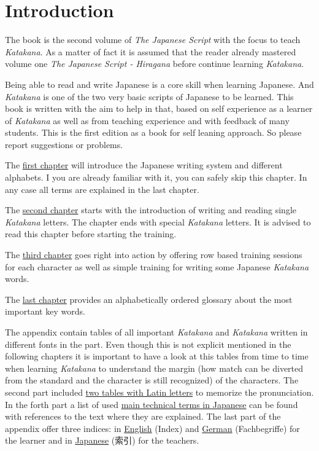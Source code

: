 \chapter*{Introduction}

The book is the second volume of \textit{The Japanese Script} with the focus to
teach \textit{Katakana}. As a matter of fact it is assumed that the reader
already mastered volume one \textit{The Japanese Script - Hiragana} before
continue learning \textit{Katakana}. 

Being able to read and write Japanese is a core skill when learning Japanese.
And \textit{Katakana} is one of the two very basic scripts of Japanese to be
learned.  This book is written with the aim to help in that, based on self
experience as a learner of \textit{Katakana} as well as from teaching
experience and with feedback of many students. This is the first edition as a
book for self leaning approach. So please report suggestions or problems. 

The \hyperref[chap:JapaneseWritingSystem]{first chapter} will introduce the
Japanese writing system and different alphabets. I you are already familiar
with it, you can safely skip this chapter. In any case all terms are explained
in the last chapter.

The \hyperref[chap:WritingKatakana]{second chapter} starts with the
introduction of writing and reading single \textit{Katakana} letters. The
chapter ends with special \textit{Katakana} letters. It is advised to read this
chapter before starting the training. 

The \hyperref[chap:KatakanaTraining]{third chapter} goes right into action by
offering row based training sessions for each character as well as simple
training for writing some Japanese \textit{Katakana} words.

The \hyperref[chap:Terminology]{last chapter} provides an alphabetically
ordered glossary about the most important key words.

The appendix contain tables of all important \textit{Katakana} and
\textit{Katakana} written in different fonts in the
 part. Even though this is not explicit mentioned
in the following chapters it is important to have a look at this tables from
time to time when learning \textit{Katakana} to understand the margin (how
match can be diverted from the standard and the character is still recognized)
of the characters. The second part included \hyperref[chap:RomajiTables]{two
tables with Latin letters} to memorize the pronunciation. In the forth part a
list of used \hyperref[chap:JapaneseTechnicalTerms]{main technical terms in
Japanese} can be found with references to the text where they are explained.
The last part of the appendix offer three indices: in
\hyperref[chap:EnglishIndex]{English} (Index) and
\hyperref[chap:GermanIndex]{German} (Fachbegriffe) for the learner and in
\hyperref[chap:JapaneseIndex]{Japanese} (索引) for the teachers. 




